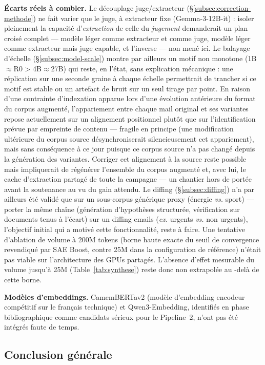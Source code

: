 \documentclass[11pt]{article}
\begin{document}
\textbf{Écarts réels à combler.} Le découplage juge/extracteur
(\S\ref{subsec:correction-methode}) ne fait varier que le juge, à extracteur
fixe (Gemma-3-12B-it) : isoler pleinement la capacité d'\emph{extraction} de
celle du \emph{jugement} demanderait un plan croisé complet --- modèle léger
comme extracteur et comme juge, modèle léger comme extracteur mais juge
capable, et l'inverse --- non mené ici. Le balayage d'échelle
(\S\ref{subsec:model-scale}) montre par ailleurs un motif non monotone
(1B$\approx$R0 > 4B$\approx$27B) qui reste, en l'état, sans explication
mécanique : une réplication sur une seconde graine à chaque échelle
permettrait de trancher si ce motif est stable ou un artefact de bruit sur
un seul tirage par point. En raison d'une contrainte d'indexation apparue
lors d'une évolution antérieure du format du corpus augmenté, l'appariement
entre chaque mail original et ses variantes repose actuellement sur un
alignement positionnel plutôt que sur l'identification prévue par empreinte
de contenu --- fragile en principe (une modification ultérieure du corpus
source désynchroniserait silencieusement cet appariement), mais sans
conséquence à ce jour puisque ce corpus source n'a pas changé depuis la
génération des variantes. Corriger cet alignement à la source reste possible
mais impliquerait de régénérer l'ensemble du corpus augmenté et, avec lui,
le cache d'extraction partagé de toute la campagne --- un chantier hors de
portée avant la soutenance au vu du gain attendu.
Le diffing (\S\ref{subsec:diffing}) n'a par ailleurs été validé que sur un
sous-corpus générique proxy (énergie \emph{vs.} sport) --- porter la même
chaîne (génération d'hypothèses structurée, vérification sur documents tenus
à l'écart) sur un diffing emails (\emph{ex.} urgents \emph{vs.} non urgents),
l'objectif initial qui a motivé cette fonctionnalité, reste à faire. Une
tentative d'ablation de volume à 200M tokens (borne haute exacte du seuil de
convergence revendiqué par SAE Boost, contre 25M dans la configuration de
référence) n'était pas viable sur l'architecture des GPUs partagés. L'absence d'effet mesurable du
volume jusqu'à 25M (Table~\ref{tab:synthese}) reste donc non extrapolée au
-delà de cette borne.

\textbf{Modèles d'embeddings.} CamemBERTav2 (modèle d'embedding encodeur compétitif sur le français technique) et Qwen3-Embedding,
identifiés en phase bibliographique comme candidats sérieux pour le
Pipeline~2, n'ont pas été intégrés faute de temps.

\subsection{Conclusion générale}
\end{document}
